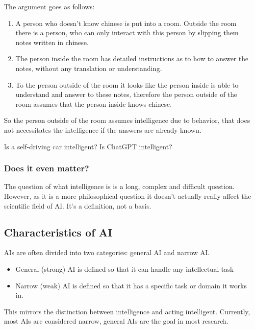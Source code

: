 \documentclass[
../../EiKI_Summary.tex,
]
{subfiles}
\begin{document}
The argument goes as follows:
\begin{enumerate}
    \item A person who doesn't know chinese is put into a room. Outside the room there is a person, who can only interact with this person by slipping them notes written in chinese.
    \item The person inside the room has detailed instructions as to how to answer the notes, without any translation or understanding. 
    \item To the person outside of the room it looks like the person inside is able to understand and answer to these notes, therefore the person outside of the room assumes that the person inside knows chinese.
\end{enumerate}

So the person outside of the room assumes intelligence due to behavior, that does not necessitates the intelligence if the answers are already known.

Is a self-driving car intelligent? Is ChatGPT intelligent?

\subsubsection{Does it even matter?}
The question of what intelligence is is a long, complex and difficult question. However, as it is a more philosophical question it doesn't actually really affect the scientific field of AI. It's a definition, not a basis.

\subsection{Characteristics of AI}

AIs are often divided into two categories: general AI and narrow AI. 

\begin{defbox}
    \begin{itemize}
        \item General (strong) AI is defined so that it can handle any intellectual task
        \item Narrow (weak) AI is defined so that it has a specific task or domain it works in.
    \end{itemize}
    This mirrors the distinction between intelligence and acting intelligent.
    Currently, most AIs are considered narrow, general AIs are the goal in most research.
\end{defbox}
\end{document}
